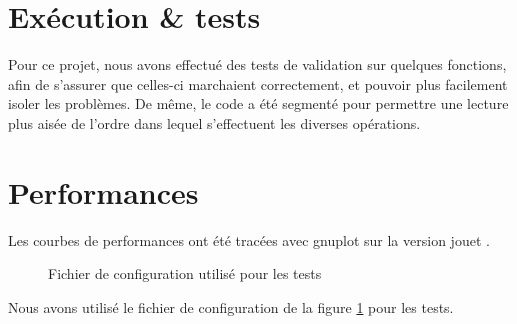 \section{Exécution \& tests} %
\label{sec:execution}

Pour ce projet, nous avons effectué des tests de validation sur quelques fonctions, afin de s'assurer que celles-ci marchaient correctement, et pouvoir plus facilement isoler les problèmes. 
De même, le code a été segmenté pour permettre une lecture plus aisée de l'ordre dans lequel s'effectuent les diverses opérations.

\section{Performances} %
\label{sec:perf}

Les courbes de performances ont été tracées avec gnuplot sur la version \og jouet \fg. 

\begin{figure}[H]
\centering

\caption{Fichier de configuration utilisé pour les tests}
\label{fig:conf}
\end{figure}
Nous avons utilisé le fichier de configuration de la figure \ref{fig:conf} pour les tests.

